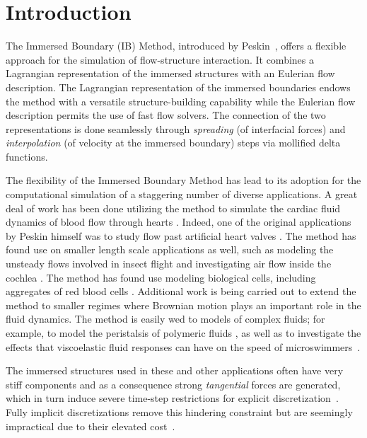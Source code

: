 %
%
\chapter{Introduction}
\noindent
The Immersed Boundary (IB) Method, introduced by Peskin~\cite{Peskin77}, offers a flexible approach  for the simulation of flow-structure interaction. It combines a Lagrangian representation of 
the immersed structures with  an Eulerian flow description.  The Lagrangian representation of the immersed boundaries endows the method with a versatile structure-building capability while the  Eulerian flow description permits  the use of fast flow solvers. The connection of the two representations is done seamlessly through {\em spreading} (of interfacial forces) and {\em interpolation} (of velocity at the immersed boundary) steps via mollified delta functions.

The flexibility of the Immersed Boundary Method has lead to its adoption for the computational simulation of a staggering number of diverse applications. A great deal of work has been done utilizing the method to simulate the cardiac fluid dynamics of blood flow through hearts
\cite{mcqueen2002heart,McQueenPeskin2000,McQueen-Peskin89,mcqueen1997shared}. Indeed, one of the original applications by Peskin himself was to study flow past artificial heart valves \cite{peskin1972flow}. The method has found use on smaller length scale applications as well, such as modeling the unsteady flows involved in insect flight \cite{miller2004vortices,miller2009flexible} and investigating air flow inside the cochlea \cite{beyer1992computational}. The method has found use modeling biological cells, including aggregates of red blood cells \cite{liu2006rheology}. Additional work is being carried out to extend the method to smaller regimes where Brownian motion plays an important role \cite{atzberger2007stochastic} in the fluid dynamics. The method is easily wed to models of complex fluids; for example, to model the peristalsis of polymeric fluids \cite{teran2008peristaltic,chrispell2010peristaltic}, as well as to investigate the effects that viscoelastic fluid responses can have on the speed of microswimmers~\cite{teran2010viscoelastic}.
  
The immersed structures used in these and other applications often have very stiff components and as a consequence strong  {\em tangential} forces are generated,  which in turn   induce severe time-step restrictions for explicit discretization~\cite{SW95,SW99}.  Fully implicit discretizations remove this  hindering constraint but are seemingly impractical due to their elevated cost~\cite{TP92, MP93}.

